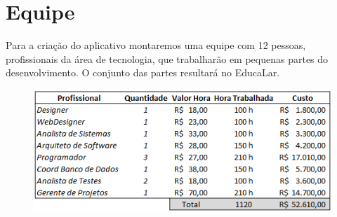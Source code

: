 \chapter[Equipe]{Equipe}

Para a criação do aplicativo montaremos uma equipe com 12 pessoas, profissionais da área de tecnologia, que trabalharão em pequenas partes do desenvolvimento. O conjunto das partes resultará no EducaLar.


\begin{figure}[htb]
	\begin{center}
	    \includegraphics[scale=0.9]{figuras/tabelaCustos}
	\end{center}
\end{figure}

